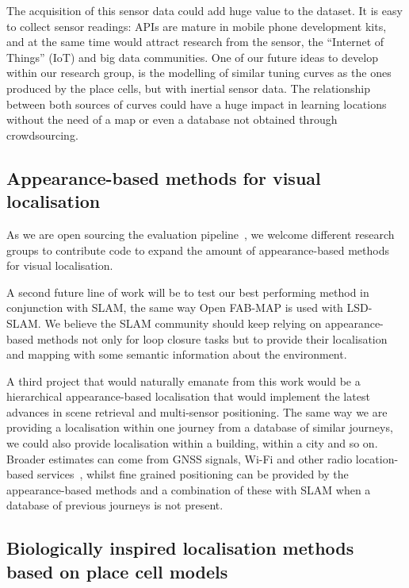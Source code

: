 The acquisition of this sensor data could add huge value to the dataset. It is easy to collect sensor readings: APIs are mature in mobile phone development kits, and at the same time would attract research from the sensor, the ``Internet of Things'' (IoT) and big data communities. One of our future ideas to develop within our research group, is the modelling of similar tuning curves as the ones produced by the place cells, but with inertial sensor data. The relationship between both sources of curves could have a huge impact in learning locations without the need of a map or even a database not obtained through crowdsourcing.

\subsection{Appearance-based methods for visual localisation}
As we are open sourcing the evaluation pipeline~\cite{jose_rivera_rubio_2015_33762}, we welcome different research groups to contribute code to expand the amount of appearance-based methods for visual localisation.

A second future line of work will be to test our best performing method in conjunction with SLAM, the same way Open FAB-MAP is used with LSD-SLAM. We believe the SLAM community should keep relying on appearance-based methods not only for loop closure tasks but to provide their localisation and mapping with some semantic information about the environment.

A third project that would naturally emanate from this work would be a hierarchical appearance-based localisation that would implement the latest advances in scene retrieval and multi-sensor positioning. The same way we are providing a localisation within one journey from a database of similar journeys, we could also provide localisation within a building, within a city and so on. Broader estimates can come from GNSS signals, Wi-Fi and other radio location-based services~\cite{wang2012no}, whilst fine grained positioning can be provided by the appearance-based methods and a combination of these with SLAM when a database of previous journeys is not present.

\subsection{Biologically inspired localisation methods based on place cell models}

